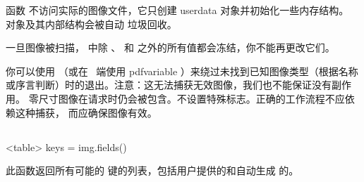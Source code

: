 函数  不访问实际的图像文件，它只创建 
userdata 对象并初始化一些内存结构。 对象及其内部结构会被自动
垃圾回收。

一旦图像被扫描， 中除 、 和
 之外的所有值都会冻结，你不能再更改它们。

你可以使用 （或在 \TEX\ 端使用 \lpr
{pdfvariable} ）来绕过未找到已知图像类型（根据名称
或序言判断）时的退出。注意：这无法捕获无效图像，我们也不能保证没有副作用。
零尺寸图像在请求时仍会被包含。不设置特殊标志。正确的工作流程不应依赖这种捕获，
而应确保图像有效。

\subsection{}


\begin{typing}
<table> keys = img.fields()
\end{typing}

此函数返回所有可能的  键的列表，包括用户提供的和自动生成
的。

